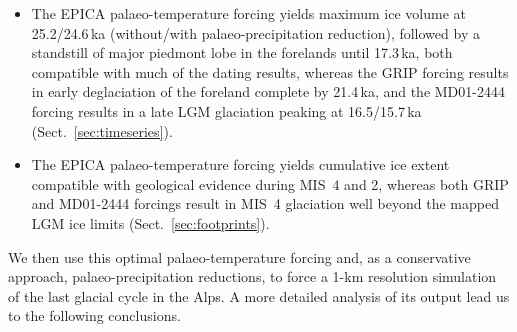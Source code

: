 \documentclass[tc, manuscript]{copernicus}
\begin{document}
    \begin{itemize}
      \item The EPICA palaeo-temperature forcing yields maximum ice volume at
            25.2/24.6\,ka (without/with palaeo-precipitation reduction),
            followed by a standstill of major piedmont lobe in the forelands
            until 17.3\,ka, both compatible with much of the dating results,
            whereas the GRIP forcing results in early deglaciation of the
            foreland complete by 21.4\,ka, and the MD01-2444 forcing results in
            a late LGM glaciation peaking at 16.5/15.7\,ka
            (Sect.~\ref{sec:timeseries}).
      \item The EPICA palaeo-temperature forcing yields cumulative ice extent
            compatible with geological evidence during MIS~4 and 2, whereas
            both GRIP and MD01-2444 forcings result in MIS~4 glaciation well
            beyond the mapped LGM ice limits (Sect.~\ref{sec:footprints}).
    \end{itemize}

    We then use this optimal palaeo-temperature forcing and, as a conservative
    approach, palaeo-precipitation reductions, to force a 1-km resolution
    simulation of the last glacial cycle in the Alps. A more detailed analysis
    of its output lead us to the following conclusions.
\end{document}
